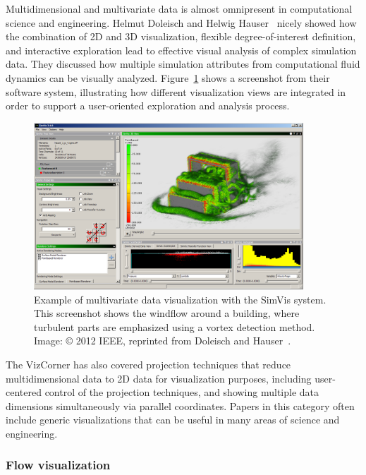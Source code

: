 \documentclass[10pt,journal,compsoc]{IEEEtran}
\begin{document}
Multidimensional and multivariate data is almost omnipresent in computational science and engineering. 
Helmut Doleisch and Helwig Hauser~\cite{Doleisch2012} nicely showed how the combination of 2D and 3D visualization, flexible degree-of-interest definition, and interactive exploration lead to effective visual analysis of complex simulation data. They discussed how multiple simulation attributes from computational fluid dynamics can be visually analyzed. Figure~\ref{fig:simvis} shows a screenshot from their software system, illustrating how different visualization views are integrated in order to support a user-oriented exploration and analysis process.

\begin{figure}
    \begin{center}    
        \includegraphics[width=0.9\textwidth]{simvis.png}
        \caption{Example of multivariate data visualization with the SimVis system. This screenshot shows the windflow around a building, where turbulent parts are emphasized using a vortex detection method. Image: \copyright{} 2012 IEEE, reprinted from Doleisch and Hauser~\cite{Doleisch2012}.
  \label{fig:simvis}}        
    \end{center}
\end{figure}

The VizCorner has also covered projection techniques that reduce multidimensional data to 2D data for visualization purposes, including user-centered control of the projection techniques, and showing multiple data dimensions simultaneously via parallel coordinates. Papers in this category often include generic visualizations that can be useful in many areas of science and engineering.

\subsubsection*{Flow visualization}
\end{document}
